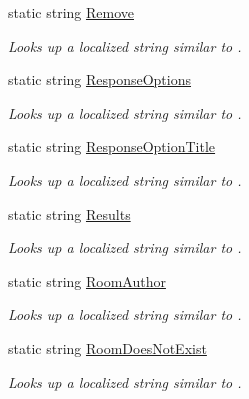 \begin{DoxyCompactItemize}
static string \hyperlink{class_wis_r_1_1_app___resources_1_1_resource_a92c53da8a2506f34e43efa469ecc8085}{Remove}
\begin{DoxyCompactList}\small\item\em Looks up a localized string similar to . \end{DoxyCompactList}\item 
static string \hyperlink{class_wis_r_1_1_app___resources_1_1_resource_a9088f8a911703024cb80747cb5b98858}{Response\+Options}
\begin{DoxyCompactList}\small\item\em Looks up a localized string similar to . \end{DoxyCompactList}\item 
static string \hyperlink{class_wis_r_1_1_app___resources_1_1_resource_a184e04779ae3eef327cc4e1c5abf2266}{Response\+Option\+Title}
\begin{DoxyCompactList}\small\item\em Looks up a localized string similar to . \end{DoxyCompactList}\item 
static string \hyperlink{class_wis_r_1_1_app___resources_1_1_resource_a91e77ae8d9d5371de5fbb386ef7b6398}{Results}
\begin{DoxyCompactList}\small\item\em Looks up a localized string similar to . \end{DoxyCompactList}\item 
static string \hyperlink{class_wis_r_1_1_app___resources_1_1_resource_a96b60c71774b8de529c2da3bb464f844}{Room\+Author}
\begin{DoxyCompactList}\small\item\em Looks up a localized string similar to . \end{DoxyCompactList}\item 
static string \hyperlink{class_wis_r_1_1_app___resources_1_1_resource_a875fa19e53670abe241170ba073ee4b3}{Room\+Does\+Not\+Exist}
\begin{DoxyCompactList}\small\item\em Looks up a localized string similar to . \end{DoxyCompactList}\item 

\end{DoxyCompactItemize}
